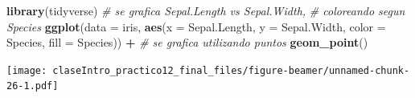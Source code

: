 \documentclass[ignorenonframetext,]{beamer}
\newenvironment{Shaded}{\begin{snugshade}}{\end{snugshade}}
\newcommand{\CommentTok}[1]{\textcolor[rgb]{0.56,0.35,0.01}{\textit{#1}}}
\newcommand{\DataTypeTok}[1]{\textcolor[rgb]{0.13,0.29,0.53}{#1}}
\newcommand{\KeywordTok}[1]{\textcolor[rgb]{0.13,0.29,0.53}{\textbf{#1}}}
\newcommand{\NormalTok}[1]{#1}
\newcommand{\OperatorTok}[1]{\textcolor[rgb]{0.81,0.36,0.00}{\textbf{#1}}}
\newcommand{\StringTok}[1]{\textcolor[rgb]{0.31,0.60,0.02}{#1}}
\begin{document}
\begin{frame}[fragile]{}
\protect\hypertarget{section-11}{}


\begin{Shaded}
\begin{Highlighting}[]
\KeywordTok{library}\NormalTok{(tidyverse)}
  \CommentTok{# se grafica Sepal.Length vs Sepal.Width,}
  \CommentTok{# coloreando segun Species}
\KeywordTok{ggplot}\NormalTok{(}\DataTypeTok{data =}\NormalTok{ iris,}
          \KeywordTok{aes}\NormalTok{(}\DataTypeTok{x =}\NormalTok{ Sepal.Length, }
              \DataTypeTok{y =}\NormalTok{ Sepal.Width, }
              \DataTypeTok{color =}\NormalTok{ Species, }
              \DataTypeTok{fill =}\NormalTok{ Species)) }\OperatorTok{+}
\StringTok{  }\CommentTok{# se grafica utilizando puntos}
\StringTok{  }\KeywordTok{geom_point}\NormalTok{() }
\end{Highlighting}
\end{Shaded}

\end{frame}

\begin{frame}{}
\protect\hypertarget{section-12}{}


\texttt{[image: claseIntro\_practico12\_final\_files/figure-beamer/unnamed-chunk-26-1.pdf]}

\end{frame}
\end{document}

